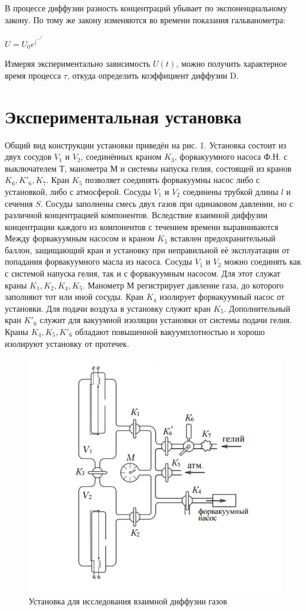 \documentclass[a4paper,12pt]{article} %
\begin{document}
\item В процессе диффузии разность концентраций убывает по экспоненциальному закону. По тому же закону изменяются во времени показания гальванометра:
\begin{center}
$\displaystyle U = U_0 e^(^-^t^/^\tau^)$
\end{center}
Измеряя экспериментально зависимость $U(t)$, можно получить характерное время процесса $\tau$, откуда определить коэффициент диффузии D.


\section{Экспериментальная установка}


\item Общий вид конструкции установки приведён на рис. 1. Установка состоит из двух сосудов $V_1$ и $V_2$, соединённых краном $K_3$, форвакуумного насоса Ф.Н. с выключателем Т, манометра М и системы напуска гелия, состоящей из кранов $K_6, K'_6, K_7$. Кран $K_5$ позволяет соединять форвакуумны насос либо с установкой, либо с атмосферой. Сосуды $V_1$ и $V_2$ соединены трубкой длины $l$ и сечения $S$. Сосуды заполнены смесь двух газов при одинаковом давлении, но с различной концентрацией компонентов. Вследствие взаимной диффузии концентрации каждого из компонентов с течением времени выравниваются Между форвакуумным насосом и краном $K_5$ вставлен предохранительный баллон, защищающий кран и установку при неправильной её эксплуатации от попадания форвакуумного масла из насоса. Сосуды $V_1$ и $V_2$ можно соединять как с системой напуска гелия, так и с форвакуумным насосом. Для этот служат краны $K_1, K_2, K_4, K_5$. Манометр М регистрирует давление газа, до которого заполняют тот или иной сосуды. Кран $K_4$ изолирует форвакуумный насос от установки. Для подачи воздуха в установку служит кран $K_5$. Дополнительный кран $K'_6$ служит для вакуумной изоляции установки от системы подачи гелия. Краны $K_4, K_5, K'_6$ обладают повышенной вакуумплотностью и хорошо изолируют установку от протечек.

\begin{figure}[H]
    \centering
    \includegraphics[width=9.5 cm]{facility.PNG}
    \caption{Установка для исследования взаимной диффузии газов}
    \label{fig:vac}
\end{figure}
\end{document}
